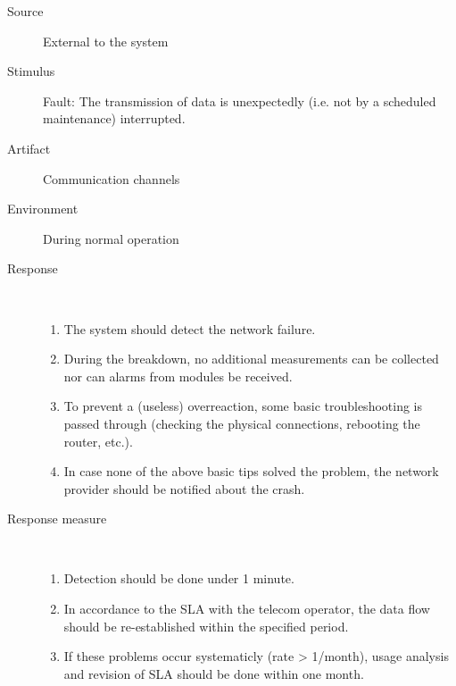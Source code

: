 \begin{description}
	\item[Source] External to the system
	\item[Stimulus] Fault: The transmission of data is unexpectedly
	(i.e. not by a scheduled maintenance) interrupted.
	\item[Artifact] Communication channels
	\item[Environment] During normal operation
	\item[Response] \
	\begin{enumerate}
	  \item The system should detect the network failure.
	  \item During the breakdown, no additional measurements can be collected nor
	  can alarms from modules be received. 
	  \item To prevent a (useless) overreaction, some basic troubleshooting is
	  passed through (checking the physical connections, rebooting the router,
	  etc.).
	  \item In case none of the above basic tips solved the problem, the network
	  provider should be notified about the crash.
	\end{enumerate}
	\item[Response measure] \
	\begin{enumerate}
	  \item Detection should be done under 1 minute.
	  \item In accordance to the SLA with the telecom operator, the data flow
	  should be re-established within the specified period.
	  \item If these problems occur systematicly (rate > 1/month), usage
	  analysis and revision of SLA should be done within one month.
	\end{enumerate}
\end{description}